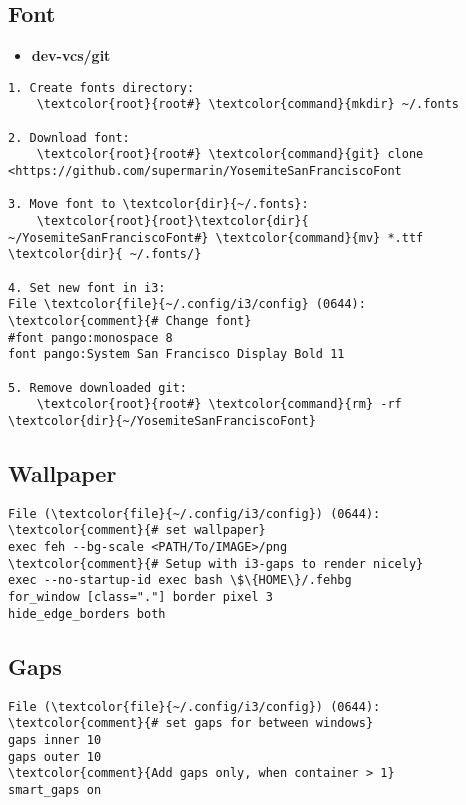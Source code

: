 \documentclass[10pt, a4paper, onecolumn, openany]{book}         %
\begin{document}
\subsection{Font}
\begin{itemize}
    \item \textbf{dev-vcs/git}
\end{itemize}
\begin{Verbatim}[commandchars=\\\{\}]
1. Create fonts directory:
    \textcolor{root}{root#} \textcolor{command}{mkdir} ~/.fonts

2. Download font:
    \textcolor{root}{root#} \textcolor{command}{git} clone <https://github.com/supermarin/YosemiteSanFranciscoFont
    
3. Move font to \textcolor{dir}{~/.fonts}:
    \textcolor{root}{root}\textcolor{dir}{ ~/YosemiteSanFranciscoFont#} \textcolor{command}{mv} *.ttf \textcolor{dir}{ ~/.fonts/}
    
4. Set new font in i3:
File \textcolor{file}{~/.config/i3/config} (0644):
\textcolor{comment}{# Change font}
#font pango:monospace 8
font pango:System San Francisco Display Bold 11

5. Remove downloaded git:
    \textcolor{root}{root#} \textcolor{command}{rm} -rf \textcolor{dir}{~/YosemiteSanFranciscoFont}
\end{Verbatim}

\subsection{Wallpaper}
\begin{Verbatim}[commandchars=\\\{\}]
File (\textcolor{file}{~/.config/i3/config}) (0644):
\textcolor{comment}{# set wallpaper}
exec feh --bg-scale <PATH/To/IMAGE>/png
\textcolor{comment}{# Setup with i3-gaps to render nicely}
exec --no-startup-id exec bash \$\{HOME\}/.fehbg
for_window [class="."] border pixel 3
hide_edge_borders both
\end{Verbatim}


\subsection{Gaps}
\begin{Verbatim}[commandchars=\\\{\}]
File (\textcolor{file}{~/.config/i3/config}) (0644):
\textcolor{comment}{# set gaps for between windows}
gaps inner 10
gaps outer 10
\textcolor{comment}{Add gaps only, when container > 1}
smart_gaps on
\end{Verbatim}
\end{document}
